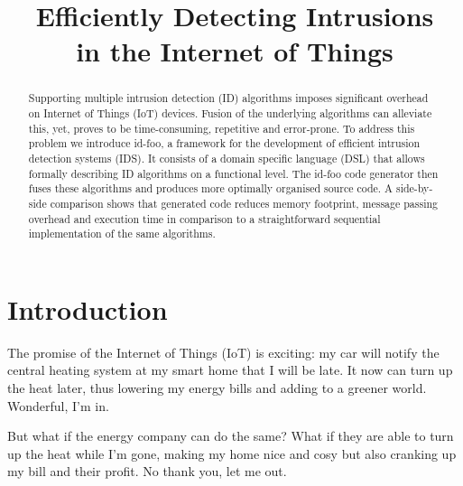 \documentclass[conference]{IEEEtran}
\begin{document}
\expandafter\def\csname PY@tok@err\endcsname{}

\title{Efficiently Detecting Intrusions\\in the Internet of Things}

\author{%
}

\maketitle

\begin{abstract}

Supporting multiple intrusion detection (ID) algorithms imposes significant
overhead on Internet of Things (IoT) devices. Fusion of the underlying
algorithms can alleviate this, yet, proves to be time-consuming, repetitive and
error-prone. To address this problem we introduce id-foo, a framework for the
development of efficient intrusion detection systems (IDS). It consists of a
domain specific language (DSL) that allows formally describing ID algorithms on
a functional level. The id-foo code generator then fuses these algorithms and
produces more optimally organised source code. A side-by-side comparison shows
that generated code reduces memory footprint, message passing overhead and
execution time in comparison to a straightforward sequential implementation of
the same algorithms.

\end{abstract}

\section{Introduction}


The promise of the Internet of Things (IoT) is exciting: my car will notify the
central heating system at my smart home \cite{aldrich2003smart} that I will be
late. It now can turn up the heat later, thus lowering my energy bills and
adding to a greener world. Wonderful, I'm in.

But what if the energy company can do the same? What if they are able to turn
up the heat while I'm gone, making my home nice and cosy but also cranking up
my bill and their profit. No thank you, let me out.
\end{document}
